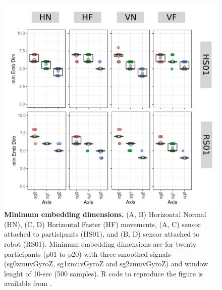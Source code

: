 \begin{figure}
\centering
\includegraphics[width=1.0\textwidth]{CAO}
	\caption{
	{\bf Minimum embedding dimensions.} 
		(A, B) Horizontal Normal (HN), (C, D) Horizontal Faster (HF) 
		movements,
		(A, C) sensor attached to participants (HS01), and
		(B, D) sensor attached to robot (RS01).
		Minimum embedding dimensions are for twenty participants 
		(p01 to p20) with three smoothed signals 
		(sg0zmuvGyroZ, sg1zmuvGyroZ and sg2zmuvGyroZ)
		and window lenght of 10-sec (500 samples).
		R code to reproduce the figure is available 
		from \cite{hwum2018}.
        }
    \label{fig:CAO}
\end{figure}




